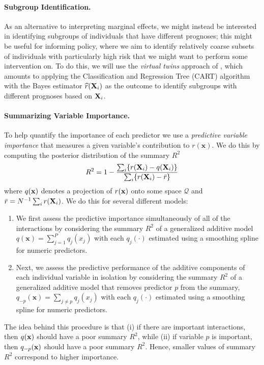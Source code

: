\documentclass[12pt]{article}
\newcommand{\bx}{\mathbf{x}}
\newcommand{\bfX}{{\bf X}}
\newcommand{\bfx}{{\bf x}}
\begin{document}
\paragraph{Subgroup Identification.}
As an alternative to interpreting marginal effects, we might instead be interested in identifying subgroups of individuals that have different prognoses; this might be useful for informing policy, where we aim to identify relatively coarse subsets of individuals with particularly high risk that we might want to perform some intervention on. To do this, we will use the \emph{virtual twins} approach of \citet{foster2011subgroup}, which amounts to applying the Classification and Regression Tree (CART) algorithm with the Bayes estimator $\widehat r(\bfX_i)$ as the outcome to identify subgroups with different prognoses based on $\bfX_i$.

\paragraph{Summarizing Variable Importance.}
To help quantify the importance of each predictor we use a \emph{predictive variable importance} that measures a given variable's contribution to $r(\bx)$. We do this by computing the posterior distribution of the summary $R^2$ \citep{woody2020model}
\begin{align*}
    R^2 = 1 - \frac{\sum_i \{r(\bfX_i) - q(\bfX_i)\}}{\sum_i \{r(\bfX_i) - \bar r\}}
\end{align*}
where $q(\bfx)$ denotes a projection of $r(\bfx)$ onto some space $\mathcal Q$ and $\bar r = N^{-1} \sum_i r(\bfX_i)$. We do this for several different models:
\begin{enumerate}
\item We first assess the predictive importance simultaneously of all of the
    interactions by considering the summary $R^2$ of a generalized additive model $q(\bx) = \sum_{j = 1}^P q_j(x_j)$ with each $q_j(\cdot)$ estimated using a smoothing spline for numeric predictors.
    \item Next, we assess the predictive performance of the additive components of each individual variable in isolation by considering the summary $R^2$ of a generalized additive model that removes predictor $p$ from the summary, $q_{-p}(\bx) = \sum_{j \ne p} q_j(x_j)$ with each $q_j(\cdot)$ estimated using a smoothing spline for numeric predictors.
\end{enumerate}
The idea behind this procedure is that (i) if there are important interactions, then $q(\bfx)$ should have a poor summary $R^2$, while (ii) if variable $p$ is important, then $q_{-p}(\bfx)$ should have a poor summary $R^2$. Hence, smaller values of summary $R^2$ correspond to higher importance.
\end{document}
